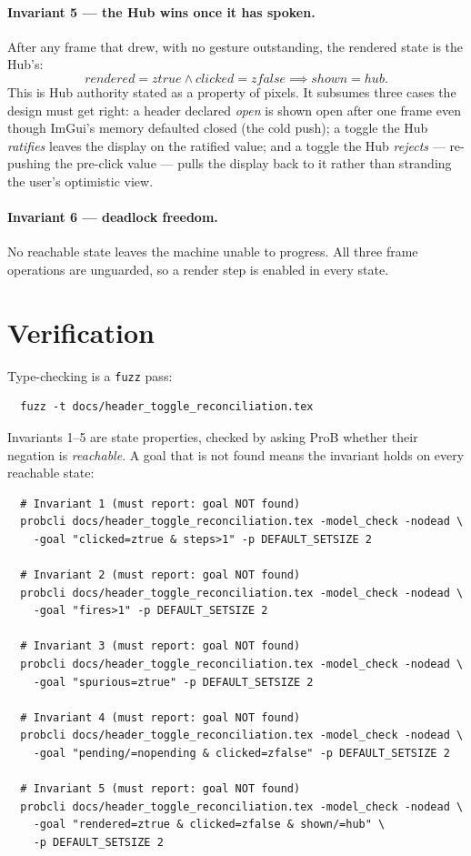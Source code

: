 \documentclass[a4paper,10pt,fleqn]{article}
\begin{document}
\paragraph{Invariant 5 --- the Hub wins once it has spoken.}
After any frame that drew, with no gesture outstanding, the rendered state is
the Hub's:
\[
  rendered = ztrue \land clicked = zfalse \implies shown = hub.
\]
This is Hub authority stated as a property of pixels.  It subsumes three cases
the design must get right: a header declared \emph{open} is shown open after
one frame even though ImGui's memory defaulted closed (the cold push); a
toggle the Hub \emph{ratifies} leaves the display on the ratified value; and a
toggle the Hub \emph{rejects} --- re-pushing the pre-click value --- pulls the
display back to it rather than stranding the user's optimistic view.

\paragraph{Invariant 6 --- deadlock freedom.}
No reachable state leaves the machine unable to progress.  All three frame
operations are unguarded, so a render step is enabled in every state.

\section{Verification}
\label{sec:verify}

Type-checking is a \texttt{fuzz} pass:
\begin{verbatim}
  fuzz -t docs/header_toggle_reconciliation.tex
\end{verbatim}

Invariants 1--5 are state properties, checked by asking ProB whether their
negation is \emph{reachable}.  A goal that is not found means the invariant
holds on every reachable state:
\begin{verbatim}
  # Invariant 1 (must report: goal NOT found)
  probcli docs/header_toggle_reconciliation.tex -model_check -nodead \
    -goal "clicked=ztrue & steps>1" -p DEFAULT_SETSIZE 2

  # Invariant 2 (must report: goal NOT found)
  probcli docs/header_toggle_reconciliation.tex -model_check -nodead \
    -goal "fires>1" -p DEFAULT_SETSIZE 2

  # Invariant 3 (must report: goal NOT found)
  probcli docs/header_toggle_reconciliation.tex -model_check -nodead \
    -goal "spurious=ztrue" -p DEFAULT_SETSIZE 2

  # Invariant 4 (must report: goal NOT found)
  probcli docs/header_toggle_reconciliation.tex -model_check -nodead \
    -goal "pending/=nopending & clicked=zfalse" -p DEFAULT_SETSIZE 2

  # Invariant 5 (must report: goal NOT found)
  probcli docs/header_toggle_reconciliation.tex -model_check -nodead \
    -goal "rendered=ztrue & clicked=zfalse & shown/=hub" \
    -p DEFAULT_SETSIZE 2
\end{verbatim}
\end{document}
